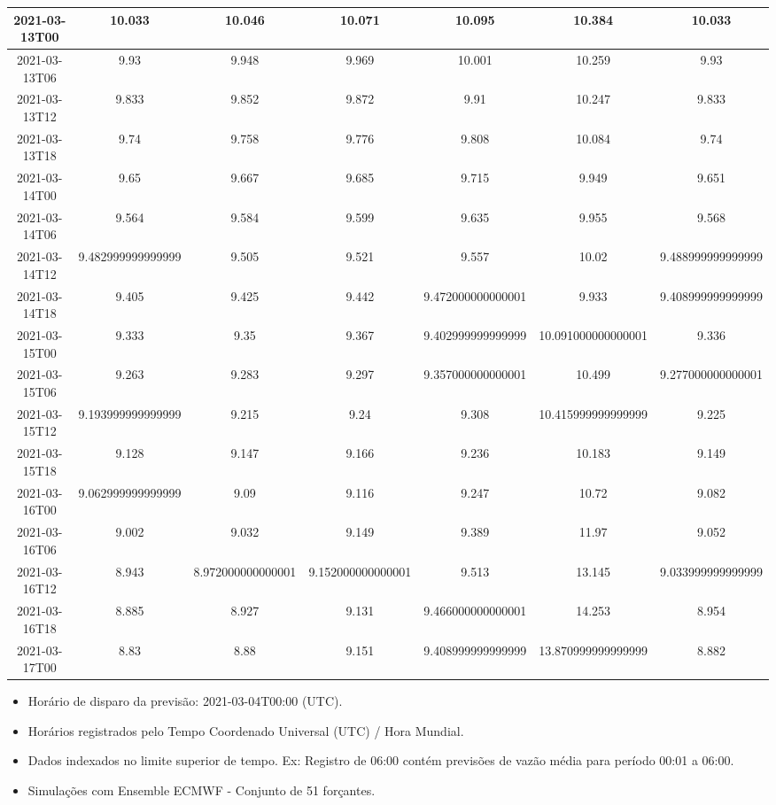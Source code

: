 \documentclass[a4paper,12pt]{article}
\begin{document}
\begin{table}[ht]
\begin{tabular}{|c|c|c|c|c|c|c|}
        \hline
        2021-03-13T00 & 10.033 & 10.046 & 10.071 & 10.095 & 10.384 & 10.033 \\
        \hline
        2021-03-13T06 & 9.93 & 9.948 & 9.969 & 10.001 & 10.259 & 9.93 \\
        \hline
        2021-03-13T12 & 9.833 & 9.852 & 9.872 & 9.91 & 10.247 & 9.833 \\
        \hline
        2021-03-13T18 & 9.74 & 9.758 & 9.776 & 9.808 & 10.084 & 9.74 \\
        \hline
        2021-03-14T00 & 9.65 & 9.667 & 9.685 & 9.715 & 9.949 & 9.651 \\
        \hline
        2021-03-14T06 & 9.564 & 9.584 & 9.599 & 9.635 & 9.955 & 9.568 \\
        \hline
        2021-03-14T12 & 9.482999999999999 & 9.505 & 9.521 & 9.557 & 10.02 & 9.488999999999999 \\
        \hline
        2021-03-14T18 & 9.405 & 9.425 & 9.442 & 9.472000000000001 & 9.933 & 9.408999999999999 \\
        \hline
        2021-03-15T00 & 9.333 & 9.35 & 9.367 & 9.402999999999999 & 10.091000000000001 & 9.336 \\
        \hline
        2021-03-15T06 & 9.263 & 9.283 & 9.297 & 9.357000000000001 & 10.499 & 9.277000000000001 \\
        \hline
        2021-03-15T12 & 9.193999999999999 & 9.215 & 9.24 & 9.308 & 10.415999999999999 & 9.225 \\
        \hline
        2021-03-15T18 & 9.128 & 9.147 & 9.166 & 9.236 & 10.183 & 9.149 \\
        \hline
        2021-03-16T00 & 9.062999999999999 & 9.09 & 9.116 & 9.247 & 10.72 & 9.082 \\
        \hline
        2021-03-16T06 & 9.002 & 9.032 & 9.149 & 9.389 & 11.97 & 9.052 \\
        \hline
        2021-03-16T12 & 8.943 & 8.972000000000001 & 9.152000000000001 & 9.513 & 13.145 & 9.033999999999999 \\
        \hline
        2021-03-16T18 & 8.885 & 8.927 & 9.131 & 9.466000000000001 & 14.253 & 8.954 \\
        \hline
        2021-03-17T00 & 8.83 & 8.88 & 9.151 & 9.408999999999999 & 13.870999999999999 & 8.882 \\
        \hline
    \end{tabular}
    \vspace{-12pt}
\end{table}

\begin{itemize}
    \item Horário de disparo da previsão: 2021-03-04T00:00 (UTC).
    \item Horários registrados pelo Tempo Coordenado Universal (UTC) / Hora Mundial.
    \item Dados indexados no limite superior de tempo. Ex: Registro de 06:00 contém previsões de vazão média para período 00:01 a 06:00.
    \item Simulações com Ensemble ECMWF - Conjunto de 51 forçantes.
\end{itemize}
\end{document}
